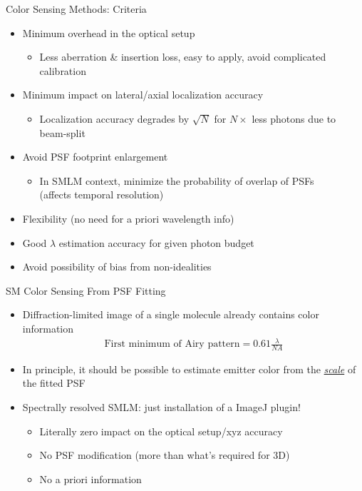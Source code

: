 \documentclass[t]{beamer}
\begin{document}
\begin{frame}{Color Sensing Methods: Criteria}
    \begin{itemize}
        \item Minimum overhead in the optical setup 
        \begin{itemize}
            \item Less aberration \& insertion loss, easy to apply, avoid complicated calibration
        \end{itemize}
            \item Minimum impact on lateral/axial localization accuracy
        \begin{itemize}
            \item Localization accuracy degrades by $\sqrt{N}$ for $N\times$ less photons due to beam-split
        \end{itemize}
            \item Avoid PSF footprint enlargement
        \begin{itemize}
            \item In SMLM context, minimize the probability of overlap of PSFs \\ (affects temporal resolution)
        \end{itemize}
        \item Flexibility (no need for a priori wavelength info)
        \item Good $\lambda$ estimation accuracy for given photon budget
        \item Avoid possibility of bias from non-idealities
    \end{itemize}
\end{frame}

\begin{frame}{
        SM Color Sensing From PSF Fitting
}
    \begin{itemize}
        \item Diffraction-limited image of a single molecule already contains color information
            \begin{gather*}
            \text{First minimum of Airy pattern}=0.61\frac{\lambda}{NA}
            \end{gather*}
        \item In principle, it should be possible to estimate emitter color from the \textit{\underline{scale}} of the fitted PSF
        \item Spectrally resolved SMLM: just installation of a ImageJ plugin!
        \begin{itemize}
        \item Literally zero impact on the optical setup/xyz accuracy
        \item No PSF modification (more than what’s required for 3D)
        \item No a priori information
        \end{itemize}
    \end{itemize}
\end{frame}
\end{document}
